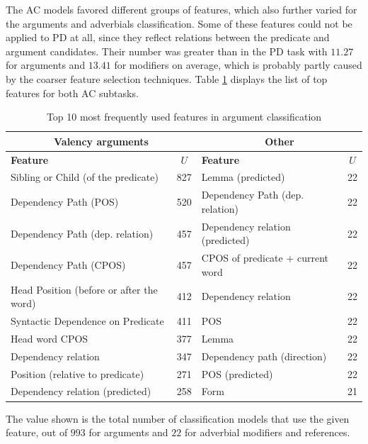 \documentclass[12pt,notitlepage]{report}
\begin{document}
The AC models favored different groups of features, which also further varied for the arguments and adverbials classification. Some of these features could not be applied to PD at all, since they reflect relations between the predicate and argument candidates. Their number was greater than in the PD task with $11.27$ for arguments and $13.41$ for modifiers on average, which is probably partly caused by the coarser feature selection techniques. Table \ref{tab:feats-ac} displays the list of top features for both AC subtasks.

\begin{table}[htb]\footnotesize
\caption{Top 10 most frequently used features in argument classification}\label{tab:feats-ac}
\begin{center}
\begin{tabular}{|l|c||l|c|}\hline
\multicolumn{2}{|c||}{\bf Valency arguments} & \multicolumn{2}{c|}{\bf Other} \\\hline
\bf Feature & $U$ & \bf Feature & $U$ \\\hline
Sibling or Child (of the predicate) & 827 & Lemma (predicted) & 22 \\
Dependency Path (POS) & 520 & Dependency Path (dep. relation) & 22 \\
Dependency Path (dep. relation)  & 457 & Dependency relation (predicted) & 22 \\
Dependency Path (CPOS) & 457 & CPOS of predicate + current word & 22 \\
Head Position (before or after the word) & 412 & Dependency relation & 22 \\
Syntactic Dependence on Predicate & 411 & POS & 22 \\
Head word CPOS & 377 & Lemma & 22 \\
Dependency relation & 347 & Dependency path (direction) & 22 \\
Position (relative to predicate) & 271 & POS (predicted) & 22 \\
Dependency relation (predicted) & 258 & Form & 21 \\\hline
\end{tabular}
\end{center}
The value shown is the total number of classification models that use the given feature, out of $993$ for arguments and $22$ for adverbial modifiers and references.
\end{table}
\end{document}
